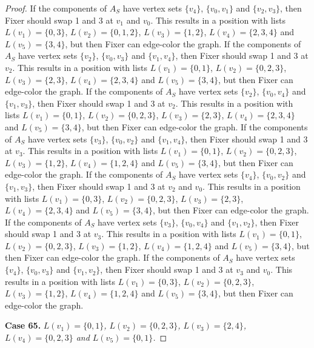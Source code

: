 \documentclass[12pt]{amsart}
\theoremstyle{plain}
\theoremstyle{definition}
\theoremstyle{remark}
\begin{document}
\begin{proof}
If the components of $A_S$ have vertex sets $\{v_4\}$, $\{v_0, v_1\}$ and $\{v_2, v_3\}$, then Fixer should swap 1 and 3 at $v_1$ and $v_0$. This results in a position with lists $L(v_1) = \{0, 3\}$, $L(v_2) = \{0, 1, 2\}$, $L(v_3) = \{1, 2\}$, $L(v_4) = \{2, 3, 4\}$ and $L(v_5) = \{3, 4\}$, but then Fixer can edge-color the graph.
If the components of $A_S$ have vertex sets $\{v_2\}$, $\{v_0, v_3\}$ and $\{v_1, v_4\}$, then Fixer should swap 1 and 3 at $v_2$. This results in a position with lists $L(v_1) = \{0, 1\}$, $L(v_2) = \{0, 2, 3\}$, $L(v_3) = \{2, 3\}$, $L(v_4) = \{2, 3, 4\}$ and $L(v_5) = \{3, 4\}$, but then Fixer can edge-color the graph.
If the components of $A_S$ have vertex sets $\{v_2\}$, $\{v_0, v_4\}$ and $\{v_1, v_3\}$, then Fixer should swap 1 and 3 at $v_2$. This results in a position with lists $L(v_1) = \{0, 1\}$, $L(v_2) = \{0, 2, 3\}$, $L(v_3) = \{2, 3\}$, $L(v_4) = \{2, 3, 4\}$ and $L(v_5) = \{3, 4\}$, but then Fixer can edge-color the graph.
If the components of $A_S$ have vertex sets $\{v_3\}$, $\{v_0, v_2\}$ and $\{v_1, v_4\}$, then Fixer should swap 1 and 3 at $v_3$. This results in a position with lists $L(v_1) = \{0, 1\}$, $L(v_2) = \{0, 2, 3\}$, $L(v_3) = \{1, 2\}$, $L(v_4) = \{1, 2, 4\}$ and $L(v_5) = \{3, 4\}$, but then Fixer can edge-color the graph.
If the components of $A_S$ have vertex sets $\{v_4\}$, $\{v_0, v_2\}$ and $\{v_1, v_3\}$, then Fixer should swap 1 and 3 at $v_2$ and $v_0$. This results in a position with lists $L(v_1) = \{0, 3\}$, $L(v_2) = \{0, 2, 3\}$, $L(v_3) = \{2, 3\}$, $L(v_4) = \{2, 3, 4\}$ and $L(v_5) = \{3, 4\}$, but then Fixer can edge-color the graph.
If the components of $A_S$ have vertex sets $\{v_3\}$, $\{v_0, v_4\}$ and $\{v_1, v_2\}$, then Fixer should swap 1 and 3 at $v_3$. This results in a position with lists $L(v_1) = \{0, 1\}$, $L(v_2) = \{0, 2, 3\}$, $L(v_3) = \{1, 2\}$, $L(v_4) = \{1, 2, 4\}$ and $L(v_5) = \{3, 4\}$, but then Fixer can edge-color the graph.
If the components of $A_S$ have vertex sets $\{v_4\}$, $\{v_0, v_3\}$ and $\{v_1, v_2\}$, then Fixer should swap 1 and 3 at $v_3$ and $v_0$. This results in a position with lists $L(v_1) = \{0, 3\}$, $L(v_2) = \{0, 2, 3\}$, $L(v_3) = \{1, 2\}$, $L(v_4) = \{1, 2, 4\}$ and $L(v_5) = \{3, 4\}$, but then Fixer can edge-color the graph.

\noindent\textbf{Case 65.  }\textit{$L(v_1) = \{0, 1\}$, $L(v_2) = \{0, 2, 3\}$, $L(v_3) = \{2, 4\}$, $L(v_4) = \{0, 2, 3\}$ and $L(v_5) = \{0, 1\}$.}


\end{proof}
\end{document}
